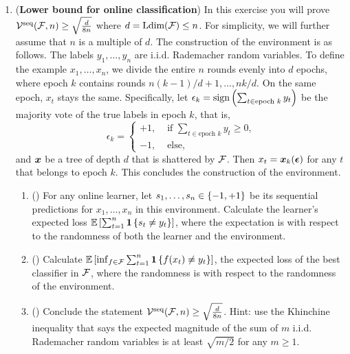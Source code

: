 \documentclass{article}
\begin{document}
\begin{enumerate}[leftmargin=*,align=left]
\begin{enumerate}[leftmargin=*,align=left]
\end{enumerate}


\newpage
\item
({\bf Lower bound for online classification})
In this exercise you will prove ${\mathcal{V}}^{\text{\rm seq}}({\mathcal{F}}, n) \geq \sqrt{\frac{d}{8n}}$ where $d = {\text{\rm Ldim}}({\mathcal{F}}) \leq n$.
For simplicity, we will further assume that $n$ is a multiple of $d$.
The construction of the environment is as follows.
The labels $y_1, \ldots, y_n$ are i.i.d. Rademacher random variables.
To define the example $x_1, \ldots, x_n$,
we divide the entire $n$ rounds evenly into $d$ epochs,
where epoch $k$ contains rounds $n(k-1)/d+1, \ldots, nk/d$.
On the same epoch, $x_t$ stays the same.
Specifically, let 
$
\epsilon_k = {\text{\rm sign}}\left(\sum_{t \in \text{epoch $k$}} y_t\right)
$
be the majority vote of the true labels in epoch $k$, that is,
\[
\epsilon_k = \begin{cases}
+1, &\text{ if $\sum_{t \in \text{epoch $k$}} y_t \geq 0$,} \\
-1, &\text{ else,}
\end{cases}
\]
and ${\boldsymbol{x}}$ be a tree of depth $d$ that is shattered by ${\mathcal{F}}$.
Then $x_t = {\boldsymbol{x}}_k({\boldsymbol{\epsilon}})$ for any $t$ that belongs to epoch $k$.
This concludes the construction of the environment. \\

\begin{enumerate}[leftmargin=*,align=left]
\vspace{5pt}
\item () 
For any online learner, let $s_1, \ldots, s_n \in \left\{-1, +1\right\}$ be its sequential predictions for $x_1, \ldots, x_n$ in this environment. Calculate the learner's expected loss $\mathbb{E}\left[\sum_{t=1}^n \boldsymbol{1}\left\{s_t \neq y_t\right\}\right]$, where the expectation is with respect to the randomness of both the learner and the environment. \\



\vspace{5pt}
\item () 
Calculate $\mathbb{E}\left[\inf_{f\in{\mathcal{F}}} \sum_{t=1}^n \boldsymbol{1}\left\{f(x_t) \neq y_t\right\}\right]$, the expected loss of the best classifier in ${\mathcal{F}}$, where the randomness is with respect to the randomness of the environment. \\


\vspace{5pt}
\item () 
Conclude the statement ${\mathcal{V}}^{\text{\rm seq}}({\mathcal{F}}, n) \geq \sqrt{\frac{d}{8n}}$. Hint: use the Khinchine inequality that says the expected magnitude of the sum of $m$ i.i.d. Rademacher random variables is at least $\sqrt{m/2}$ for any $m \geq 1$.

\end{enumerate}


\end{enumerate}
\end{document}
